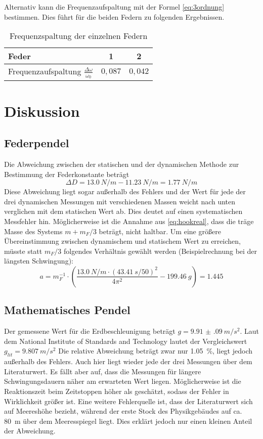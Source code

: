 Alternativ kann die Frequenzaufspaltung mit der Formel \ref{eq:3ordnung} bestimmen. Dies führt für die beiden Federn zu folgenden Ergebnissen.
\begin{table}[H]
  \centering
  \begin{tabular}{l | c | c }
    Feder & 1 & 2\\ \hline
    Frequenzaufspaltung $\frac{\Delta \omega}{\omega_0}$& $0,087$ & $0,042$
    
  \end{tabular}
  \caption{Frequenzspaltung der einzelnen Federn }
  \label{tab:frequenzspaltalt}
\end{table}
\section{Diskussion}
\subsection{Federpendel}
Die Abweichung zwischen der statischen und der dynamischen Methode zur Bestimmung der Federkonstante beträgt
\begin{equation}
  \Delta D=\SI{13.0}{N/m}-\SI{11.23}{N/m}=\SI{1.77}{N/m}
  \label{eq:ddiff}
\end{equation}
Diese Abweichung liegt sogar außerhalb des Fehlers und der Wert für jede der drei dynamischen Messungen mit verschiedenen Massen weicht nach unten verglichen mit dem statischen Wert ab. Dies deutet auf einen systematischen Messfehler hin. Möglicherweise ist die Annahme aus \cref{eq:hookreal}, dass die träge Masse des Systems $m+m_F/3$ beträgt, nicht haltbar. Um eine größere Übereinstimmung zwischen dynamischem und statischem Wert zu erreichen, müsste statt $m_F/3$ folgendes Verhältnis gewählt werden (Beispielrechnung bei der längsten Schwingung):
\begin{equation}
  a=m_F^{-1}\cdot\left(\frac{\SI{13.0}{N/m}\cdot (\SI{43.41}{s}/50)^2}{4\pi^2}-\SI{199.46}{g}\right)=1.445
  \label{eq:korrektur}
\end{equation}
\subsection{Mathematisches Pendel}
Der gemessene Wert für die Erdbeschleunigung beträgt $g=\SI{9.91(09)}{m/s^2}$. Laut dem National Institute of Standards and Technology lautet der Vergleichswert $g_{lit}=\SI{9.807}{m/s^2}$ Die relative Abweichung beträgt zwar nur \SI{1.05}{\percent}, liegt jedoch außerhalb des Fehlers. Auch hier liegt wieder jede der drei Messungen über dem Literaturwert. Es fällt aber auf, dass die Messungen für längere Schwingungsdauern näher am erwarteten Wert liegen. Möglicherweise ist die Reaktionszeit beim Zeitstoppen höher als geschätzt, sodass der Fehler in Wirklichkeit größer ist. 
Eine weitere Fehlerquelle ist, dass der Literaturwert sich auf Meereshöhe bezieht, während der erste Stock des Physikgebäudes auf ca. \SI{80}{m} über dem Meeresspiegel liegt. Dies erklärt jedoch nur einen kleinen Anteil der Abweichung.

